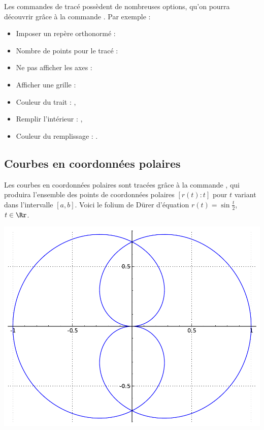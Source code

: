 \documentclass[class=report,crop=false]{standalone}
\begin{document}
Les commandes de tracé possèdent de nombreuses options, 
qu'on pourra découvrir grâce 
à la commande . 
Par exemple :
\begin{itemize}
  \item Imposer un repère orthonormé : 

  \item Nombre de points pour le tracé : 
    
  \item Ne pas afficher les axes : 
  
  \item Afficher une grille : 
    
  \item Couleur du trait : ,

  \item Remplir l'intérieur : ,

  \item Couleur du remplissage : .
\end{itemize}


\subsection{Courbes en coordonnées polaires}

Les courbes en coordonnées polaires sont tracées grâce à la 
commande , qui produira 
l'ensemble des points de coordonnées polaires $[r(t):t]$ pour 
$t$ variant dans l'intervalle $[a,b]$.
Voici le folium de Dürer d'équation 
$r(t) = \sin \frac t 2$, $t \in \Rr$.


\begin{center}
 \includegraphics[scale=0.5]{figures/durer_folium} 
\end{center}
\end{document}
